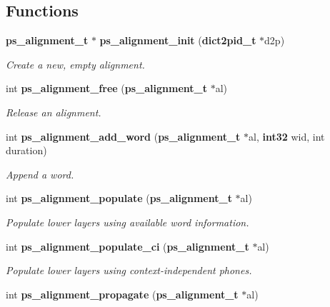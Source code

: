 \subsection*{\-Functions}
\begin{DoxyCompactItemize}
\item 
{\bf ps\-\_\-alignment\-\_\-t} $\ast$ {\bf ps\-\_\-alignment\-\_\-init} ({\bf dict2pid\-\_\-t} $\ast$d2p)\label{ps__alignment_8h_abe7668d9a53be1401896623ed42f02be}

\begin{DoxyCompactList}\small\item\em \-Create a new, empty alignment. \end{DoxyCompactList}\item 
int {\bf ps\-\_\-alignment\-\_\-free} ({\bf ps\-\_\-alignment\-\_\-t} $\ast$al)\label{ps__alignment_8h_ab8fa505f155e38d7e6f8b7dbbd070282}

\begin{DoxyCompactList}\small\item\em \-Release an alignment. \end{DoxyCompactList}\item 
int {\bf ps\-\_\-alignment\-\_\-add\-\_\-word} ({\bf ps\-\_\-alignment\-\_\-t} $\ast$al, {\bf int32} wid, int duration)\label{ps__alignment_8h_ab6264685976a8270971c86deae7a488e}

\begin{DoxyCompactList}\small\item\em \-Append a word. \end{DoxyCompactList}\item 
int {\bf ps\-\_\-alignment\-\_\-populate} ({\bf ps\-\_\-alignment\-\_\-t} $\ast$al)\label{ps__alignment_8h_a59e81853dad3d935755dcb309d8cc926}

\begin{DoxyCompactList}\small\item\em \-Populate lower layers using available word information. \end{DoxyCompactList}\item 
int {\bf ps\-\_\-alignment\-\_\-populate\-\_\-ci} ({\bf ps\-\_\-alignment\-\_\-t} $\ast$al)\label{ps__alignment_8h_ae17f691c36070955e32a2c987910acde}

\begin{DoxyCompactList}\small\item\em \-Populate lower layers using context-\/independent phones. \end{DoxyCompactList}\item 
int {\bf ps\-\_\-alignment\-\_\-propagate} ({\bf ps\-\_\-alignment\-\_\-t} $\ast$al)\label{ps__alignment_8h_adc8ea5411f8500a0affcec636d65fa8d}


\end{DoxyCompactItemize}
